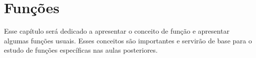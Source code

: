 \chapter{Funções}
\label{cap:funcoes}

\minitoc

Esse capítulo será dedicado a apresentar o conceito de função e apresentar
algumas funções usuais. Esses conceitos são importantes e servirão de base para
o estudo de funções específicas nas aulas posteriores.











